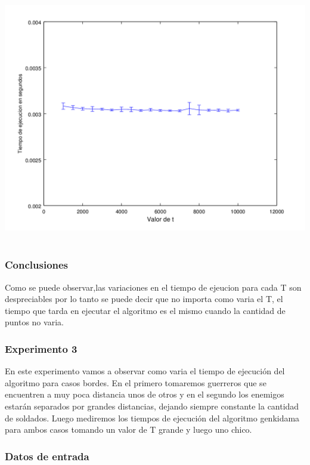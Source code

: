       	\includegraphics[height=11cm]{graficos/genkidama-exp2.png}

    	
    	\subsubsection*{Conclusiones}

		Como se puede observar,las variaciones en el tiempo de ejeucion para cada T son despreciables por lo tanto se puede decir que no importa como varia el T, el tiempo que tarda en ejecutar el algoritmo es el mismo cuando la cantidad de puntos no varia.
		\;

    	\subsubsection*{Experimento 3}

		En este experimento vamos a observar como varia el tiempo de ejecución del algoritmo para casos bordes. En el primero tomaremos guerreros que se encuentren a muy poca distancia  unos de otros y en el segundo los enemigos estarán separados por grandes distancias, dejando siempre constante la cantidad de soldados. Luego mediremos los tiempos de ejecución del algoritmo genkidama para ambos casos tomando un valor de T grande y luego uno chico.
		
		\subsubsection*{Datos de entrada}


